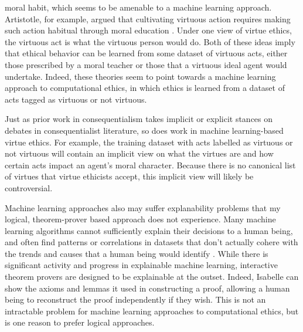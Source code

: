 \begin{isabellebody}
\begin{isamarkuptext}
moral habit, which seems to be amenable to a machine learning approach. Artistotle, for example, argued 
that cultivating virtuous action requires making such action habitual through moral education \citep{aristotle}. Under 
one view of virtue ethics, the virtuous act is what the virtuous person would do. Both of these ideas
imply that ethical behavior can be learned from some dataset of virtuous acts, either those 
prescribed by a moral teacher or those that a virtuous ideal agent would undertake. Indeed, these 
theories seem to point towards a machine learning approach to computational ethics, in which ethics is 
learned from a dataset of acts tagged as virtuous or not virtuous. 

Just as prior work in consequentialism takes implicit or explicit stances on debates in consequentialist
literature, so does work in machine learning-based virtue ethics. For example, the training 
dataset with acts labelled as virtuous or not virtuous will contain an implicit view on what the virtues
are and how certain acts impact an agent's moral character. Because there is no canonical list of virtues
that virtue ethicists accept, this implicit view will likely be controversial.

Machine learning approaches also may suffer explanability problems that my logical, theorem-prover
based approach does not experience. Many machine learning algorithms cannot sufficiently explain their 
decisions to a human being, and often find patterns or correlations in datasets that don't actually 
cohere with the trends and causes that a human being would identify \citep{puiutta}. While there is significant activity 
and progress in explainable machine learning, interactive theorem provers are designed to be explainable 
at the outset. Indeed, Isabelle can show the axioms and lemmas it used in constructing a proof, 
allowing a human being to reconstruct the proof independently if they wish. This is not an 
intractable problem for machine learning approaches to computational ethics, but is one reason to 
prefer logical approaches.


\end{isamarkuptext}
\end{isabellebody}
